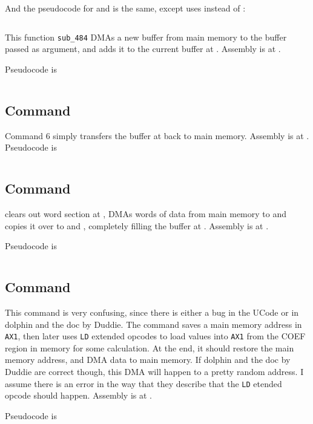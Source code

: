 And the pseudocode for  and  is the same, except  uses  instead of :

\inputminted{c}{../ucode/command_459.c}

This function \texttt{sub_484} DMAs a new buffer from main memory to the buffer passed as argument, and adds it to the current buffer at . Assembly is at .

Pseudocode is

\inputminted{c}{../ucode/mix_buffers.c}

\subsection{Command }
Command 6 simply transfers the buffer at  back to main memory. Assembly is at .
Pseudocode is

\inputminted{c}{../ucode/command_6.c}

\subsection{Command }
clears out  word section at , DMAs  words of data from main memory to  and copies it over to  and , completely filling the buffer at . Assembly is at .

Pseudocode is

\inputminted{c}{../ucode/command_7.c}

\subsection{Command }
This command is very confusing, since there is either a bug in the UCode or in dolphin and the doc by Duddie. The command saves a main memory address in \texttt{AX1}, then later uses \texttt{LD} extended opcodes to load values into \texttt{AX1} from the COEF region in memory for some calculation. At the end, it should restore the main memory address, and DMA data to main memory. If dolphin and the doc by Duddie are correct though, this DMA will happen to a pretty random address. I assume there is an error in the way that they describe that the \texttt{LD} etended opcode should happen. Assembly is at .

Pseudocode is

\inputminted{c}{../ucode/command_8.c}

